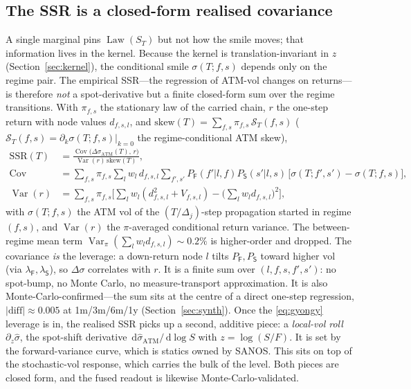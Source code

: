 \documentclass[11pt]{article}
\newcommand{\Var}{\operatorname{Var}}
\newcommand{\Cov}{\operatorname{Cov}}
\newcommand{\law}{\operatorname{Law}}
\newcommand{\SSR}{\mathrm{SSR}}
\newcommand{\dd}{\,\mathrm{d}}
\begin{document}
\subsection{The SSR is a closed-form realised covariance}
A single marginal pins $\law(S_T)$ but not how the smile moves; that information lives in
the kernel. Because the kernel is translation-invariant in $z$
(Section~\ref{sec:kernel}), the conditional smile $\sigma(T;f,s)$ depends only on the
regime pair. The empirical SSR---the regression of ATM-vol changes on returns---is therefore
\emph{not} a spot-derivative but a finite closed-form sum over the regime transitions. With
$\pi_{f,s}$ the stationary law of the carried chain, $r$ the one-step return with node
values $d_{f,s,l}$, and $\mathrm{skew}(T)=\sum_{f,s}\pi_{f,s}\,\mathcal S_T(f,s)$ ($\mathcal S_T(f,s)=\partial_k\sigma(T;f,s)|_{k=0}$ the regime-conditional ATM skew),
\begin{equation}
\begin{aligned}
\SSR(T)&=\frac{\Cov\big(\Delta\sigma_{\mathrm{ATM}}(T),\,r\big)}{\Var(r)\,\mathrm{skew}(T)},\\
\Cov&=\sum_{f,s}\pi_{f,s}\sum_l w_l\,d_{f,s,l}\!\!\sum_{f',s'}\!P_{\mathsf{F}}(f'|l,f)P_{\mathsf{S}}(s'|l,s)\,
\big[\sigma(T;f',s')-\sigma(T;f,s)\big],\\
\Var(r)&=\sum_{f,s}\pi_{f,s}\Big[\sum_l w_l(d_{f,s,l}^2+V_{f,s,l})-\big(\sum_l w_l d_{f,s,l}\big)^2\Big],
\end{aligned}
\label{eq:ssr-model}
\end{equation}
with $\sigma(T;f,s)$ the ATM vol of the $(T/\Delta_j)$-step propagation started in regime
$(f,s)$, and $\Var(r)$ the $\pi$-averaged conditional return variance. The between-regime mean
term $\Var_\pi(\sum_l w_l d_{f,s,l})\sim0.2\%$ is higher-order and dropped. The covariance \emph{is} the leverage: a down-return
node $l$ tilts $P_{\mathsf{F}},P_{\mathsf{S}}$ toward higher vol (via $\lambda_{\mathsf{F}},\lambda_{\mathsf{S}}$), so $\Delta\sigma$
correlates with $r$. It is a finite sum over $(l,f,s,f',s')$: no spot-bump, no Monte Carlo,
no measure-transport approximation. It is also Monte-Carlo-confirmed---the sum sits at the centre
of a direct one-step regression, $|\mathrm{diff}|\approx 0.005$ at 1m/3m/6m/1y
(Section~\ref{sec:synth}). Once the \eqref{eq:gyongy} leverage is in, the realised SSR picks
up a second, additive piece: a \emph{local-vol roll} $\partial_z\hat\sigma$, the spot-shift
derivative $\dd\hat\sigma_{\mathrm{ATM}}/\dd\log S$ with $z=\log(S/F)$. It is set by the
forward-variance curve, which is statics owned by SANOS. This sits on top of the stochastic-vol response, which
carries the bulk of the level. Both pieces are closed form, and the fused readout is likewise
Monte-Carlo-validated.
\end{document}
